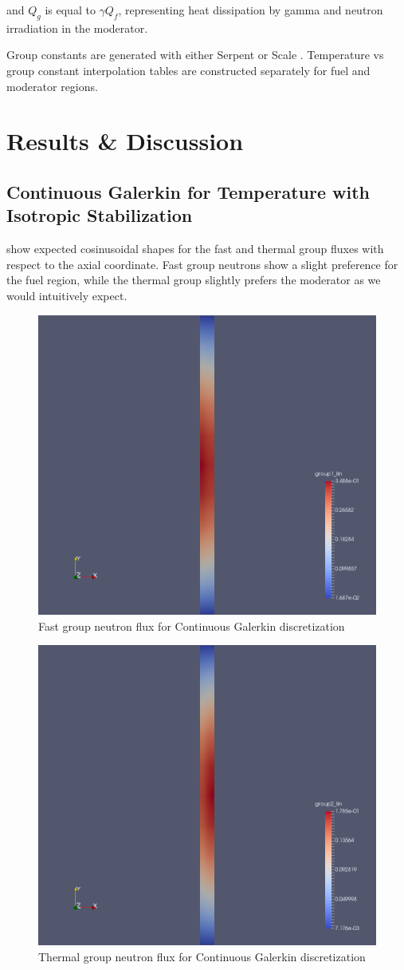 \documentclass{article}
\let\Oldsection\section
\renewcommand{\section}{\FloatBarrier\Oldsection}
\let\Oldsubsection\subsection
\renewcommand{\subsection}{\FloatBarrier\Oldsubsection}
\begin{document}
and $Q_g$ is equal to $\gamma Q_f$, representing heat dissipation by gamma and
neutron irradiation in the moderator.

Group constants are generated with either Serpent \cite{leppanen_serpent_2015}
or Scale \cite{dehart_reactor_2011}. Temperature vs group constant interpolation
tables are constructed separately for fuel and moderator regions.

\section{Results \& Discussion}

\subsection{Continuous Galerkin for Temperature with Isotropic Stabilization}

 show expected cosinusoidal shapes for the
fast and thermal group fluxes with respect to the axial coordinate. Fast group neutrons
show a slight preference for the fuel region, while the thermal group slightly
prefers the moderator as we would intuitively expect.

\begin{figure}[htpb]
  \centering
  \includegraphics[width=.5\textwidth]{nt_group_1.png}
  \caption{Fast group neutron flux for Continuous Galerkin discretization}
  \label{fig:cg_group1}
\end{figure}

\begin{figure}[htpb]
  \centering
  \includegraphics[width=.5\textwidth]{nt_group_2.png}
  \caption{Thermal group neutron flux for Continuous Galerkin discretization}
  \label{fig:cg_group2}
\end{figure}
\end{document}
